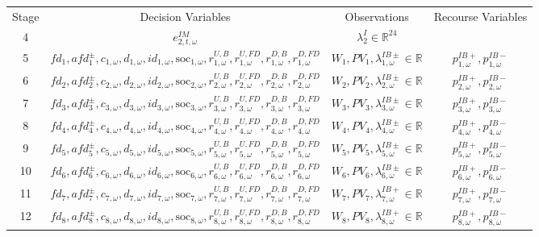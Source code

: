 \documentclass{article}
\newcommand{\R}{\mathbb{R}}
\newcommand{\soc}{\text{soc}}
\begin{document}
\begin{table}
\begin{tabular}{c c c c}
	Stage & Decision Variables & Observations & Recourse Variables \\
	4 & $e^{IM}_{2, t, \omega}$ & $\lambda^I_2 \in \R^{24}$ &  \\
	5 & $fd_1, afd^{\pm}_1, c_{1, \omega}, d_{1, \omega}, id_{1, \omega}, \soc_{1, \omega}, r^{U, B}_{1, \omega}, r^{U, FD}_{1, \omega}, r^{D, B}_{1, \omega}, r^{D, FD}_{1, \omega}$ & $W_1, PV_1, \lambda^{IB\pm}_{1, \omega} \in \R$ & $p^{IB+}_{1, \omega}, p^{IB-}_{1, \omega}$  \\
	6 & $fd_2, afd^{\pm}_2, c_{2, \omega}, d_{2, \omega}, id_{2, \omega}, \soc_{2, \omega}, r^{U, B}_{2, \omega}, r^{U, FD}_{2, \omega}, r^{D, B}_{2, \omega}, r^{D, FD}_{2, \omega}$ & $W_2, PV_2, \lambda^{IB\pm}_{2, \omega} \in \R$ & $p^{IB+}_{2, \omega}, p^{IB-}_{2, \omega}$ \\
	7 & $fd_3, afd^{\pm}_3, c_{3, \omega}, d_{3, \omega}, id_{3, \omega}, \soc_{3, \omega}, r^{U, B}_{3, \omega}, r^{U, FD}_{3, \omega}, r^{D, B}_{3, \omega}, r^{D, FD}_{3, \omega}$ & $W_3, PV_3, \lambda^{IB\pm}_{3, \omega} \in \R$ & $p^{IB+}_{3, \omega}, p^{IB-}_{3, \omega}$ \\
	8 & $fd_4, afd^{\pm}_4, c_{4, \omega}, d_{4, \omega}, id_{4, \omega}, \soc_{4, \omega}, r^{U, B}_{4, \omega}, r^{U, FD}_{4, \omega}, r^{D, B}_{4, \omega}, r^{D, FD}_{4, \omega}$ & $W_4, PV_4, \lambda^{IB\pm}_{4, \omega} \in \R$ & $p^{IB+}_{4, \omega}, p^{IB-}_{4, \omega}$ \\
	9 & $fd_5, afd^{\pm}_5, c_{5, \omega}, d_{5, \omega}, id_{5, \omega}, \soc_{5, \omega}, r^{U, B}_{5, \omega}, r^{U, FD}_{5, \omega}, r^{D, B}_{5, \omega}, r^{D, FD}_{5, \omega}$ & $W_5, PV_5, \lambda^{IB\pm}_{5, \omega} \in \R$ & $p^{IB+}_{5, \omega}, p^{IB-}_{5, \omega}$\\
	10 & $fd_6, afd^{\pm}_6, c_{6, \omega}, d_{6, \omega}, id_{6, \omega}, \soc_{6, \omega}, r^{U, B}_{6, \omega}, r^{U, FD}_{6, \omega}, r^{D, B}_{6, \omega}, r^{D, FD}_{6, \omega}$ & $W_6, PV_6, \lambda^{IB\pm}_{6, \omega} \in \R$ & $p^{IB+}_{6, \omega}, p^{IB-}_{6, \omega}$ \\
	11 & $fd_7, afd^{\pm}_7, c_{7, \omega}, d_{7, \omega}, id_{7, \omega}, \soc_{7, \omega}, r^{U, B}_{7, \omega}, r^{U, FD}_{7, \omega}, r^{D, B}_{7, \omega}, r^{D, FD}_{7, \omega}$ & $W_7, PV_7, \lambda^{IB+}_{7, \omega} \in \R$ & $p^{IB+}_{7, \omega}, p^{IB-}_{7, \omega}$ \\
	12 & $fd_8, afd^{\pm}_8, c_{8, \omega}, d_{8, \omega}, id_{8, \omega}, \soc_{8, \omega}, r^{U, B}_{8, \omega}, r^{U, FD}_{8, \omega}, r^{D, B}_{8, \omega}, r^{D, FD}_{8, \omega}$ & $W_8, PV_8, \lambda^{IB+}_{8, \omega} \in \R$ & $p^{IB+}_{8, \omega}, p^{IB-}_{8, \omega}$ \\

\end{tabular}
\end{table}
\end{document}
